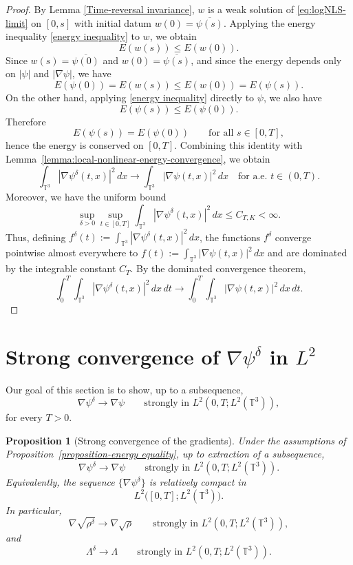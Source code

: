 \documentclass[11pt]{article}
\newtheorem{proposition}{Proposition}
\begin{document}
\begin{proof}
By Lemma \ref{Time-reversal invariance},
 $w$ is a weak solution of  \eqref{eq:logNLS-limit} on $[0,s]$ with initial datum
$w(0)=\overline{\psi(s)}$. Applying the energy inequality \eqref{energy inequality} to $w$, we obtain
\[
E(w(s)) \le E(w(0)).
\]
Since $w(s)=\overline{\psi(0)}$ and $w(0)=\overline{\psi(s)}$, and since the energy depends only on
$|\psi|$ and $|\nabla \psi|$, we have
\[
E(\psi(0)) = E(w(s)) \le E(w(0)) = E(\psi(s)).
\]
On the other hand, applying \eqref{energy inequality} directly to $\psi$, we also have
\[
E(\psi(s)) \le E(\psi(0)).
\]
Therefore
\[
E(\psi(s)) = E(\psi(0)) \qquad \text{for all } s\in [0,T],
\]
hence the energy is conserved on $[0,T]$. Combining this identity with Lemma~\ref{lemma:local-nonlinear-energy-convergence}, we obtain
\[
\int_{\mathbb{T}^3} |\nabla\psi^\delta(t,x)|^2\,dx \to \int_{\mathbb{T}^3} |\nabla\psi(t,x)|^2\,dx
\quad \text{for a.e. } t\in(0,T).
\]
Moreover, we have the uniform bound
\[
\sup_{\delta>0}\sup_{t\in[0,T]} \int_{\mathbb{T}^3} |\nabla\psi^\delta(t,x)|^2\,dx \le C_{T,K} < \infty.
\]
Thus, defining \(f^\delta(t) := \int_{\mathbb{T}^3} |\nabla\psi^\delta(t,x)|^2\,dx\), the functions \(f^\delta\) converge pointwise almost everywhere to \(f(t) := \int_{\mathbb{T}^3} |\nabla\psi(t,x)|^2\,dx\) and are dominated by the integrable constant \(C_{T}\). By the dominated convergence theorem,
\[
\int_0^T\int_{\mathbb{T}^3} |\nabla\psi^\delta(t,x)|^2\,dx\,dt
\to
\int_0^T\int_{\mathbb{T}^3} |\nabla\psi(t,x)|^2\,dx\,dt.
\]










\end{proof}








\section{Strong convergence of $\nabla\psi^{\delta}$ in $L^2$}

Our goal of this section is to show, up to a subsequence,
\[
\nabla\psi^\delta \to \nabla\psi
\qquad\text{strongly in }L^2(0,T;L^2( \mathbb{T}^3)),
\]
for every \(T>0\).




\begin{proposition}[Strong convergence of the gradients]
\label{prop:strong-convergence-gradient}
Under the assumptions of Proposition~\ref{proposition-energy equality}, up to extraction of a subsequence,
\[
\nabla \psi^\delta \to \nabla \psi
\qquad\text{strongly in } L^2(0,T;L^2( \mathbb{T}^3)).
\]
 Equivalently, the sequence \(\{\nabla\psi^\delta\}\) is relatively compact in
\[
L^2\bigl([0,T];L^2(\mathbb{T}^3)\bigr).
\]
In particular,
\[
\nabla\sqrt{\rho^\delta}\to \nabla\sqrt{\rho}
\qquad\text{strongly in }L^2(0,T;L^2( \mathbb{T}^3)),
\]
and
\[
\Lambda^\delta\to \Lambda
\qquad\text{strongly in } L^2(0,T;L^2( \mathbb{T}^3)).
\]
\end{proposition}
\end{document}
